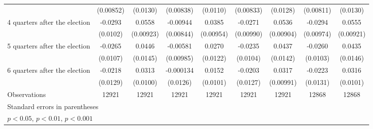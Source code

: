\begin{table}[htbp]
\begin{tabular}{l*{8}{c}}
                    &   (0.00852)         &    (0.0130)         &   (0.00838)         &    (0.0110)         &   (0.00833)         &    (0.0128)         &   (0.00811)         &    (0.0130)         \\
[1em]
 4 quarters after the election&     -0.0293\sym{**} &      0.0558\sym{***}&    -0.00944         &      0.0385\sym{***}&     -0.0271\sym{**} &      0.0536\sym{***}&     -0.0294\sym{**} &      0.0555\sym{***}\\
                    &    (0.0102)         &   (0.00923)         &   (0.00844)         &   (0.00954)         &   (0.00990)         &   (0.00904)         &   (0.00974)         &   (0.00921)         \\
[1em]
 5 quarters after the election&     -0.0265\sym{*}  &      0.0446\sym{**} &    -0.00581         &      0.0270\sym{*}  &     -0.0235\sym{*}  &      0.0437\sym{**} &     -0.0260\sym{*}  &      0.0435\sym{**} \\
                    &    (0.0107)         &    (0.0145)         &   (0.00985)         &    (0.0122)         &    (0.0104)         &    (0.0142)         &    (0.0103)         &    (0.0146)         \\
[1em]
 6 quarters after the election&     -0.0218         &      0.0313\sym{**} &   -0.000134         &      0.0152         &     -0.0203         &      0.0317\sym{**} &     -0.0223         &      0.0316\sym{**} \\
                    &    (0.0129)         &    (0.0100)         &    (0.0126)         &    (0.0101)         &    (0.0127)         &   (0.00991)         &    (0.0131)         &    (0.0101)         \\
\hline
Observations        &       12921         &       12921         &       12921         &       12921         &       12921         &       12921         &       12868         &       12868         \\
\hline\hline
\multicolumn{9}{l}{\footnotesize Standard errors in parentheses}\\
\multicolumn{9}{l}{\footnotesize \sym{*} \(p<0.05\), \sym{**} \(p<0.01\), \sym{***} \(p<0.001\)}\\
\end{tabular}
\end{table}
